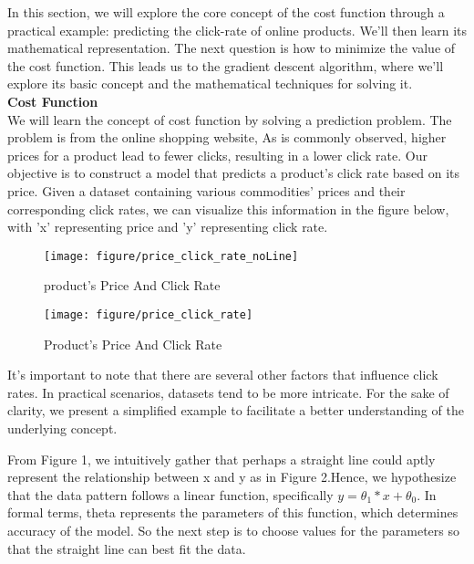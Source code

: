 \documentclass{article}
\begin{document}
    In this section, we will explore the core concept of the cost function through a practical example: predicting the click-rate of online products. We'll then learn its mathematical representation. The next question is how to minimize the value of the cost function. This leads us to the gradient descent algorithm, where we'll explore its basic concept and the mathematical techniques for solving it.\\

    \noindent
    \textbf{Cost Function}\\
    \noindent
     We will learn the concept of cost function by solving a prediction problem. The problem is from the online shopping website, As is commonly observed, higher prices for a product lead to fewer clicks, resulting in a lower click rate. Our objective is to construct a model that predicts a product's click rate based on its price. Given a dataset containing various commodities' prices and their corresponding click rates, we can visualize this information in the figure below, with 'x' representing price and 'y' representing click rate.


     \begin{figure}[htbp]
        \centering
        \texttt{[image: figure/price\_click\_rate\_noLine]}
        \caption{product's Price And Click Rate}
     \end{figure}

     \begin{figure}[htbp]
        \centering
        \texttt{[image: figure/price\_click\_rate]}
        \caption{Product's Price And Click Rate}
     \end{figure}

     It's important to note that there are several other factors that influence click rates. In practical scenarios, datasets tend to be more intricate. For the sake of clarity, we present a simplified example to facilitate a better understanding of the underlying concept.

     From Figure 1,  we intuitively gather that perhaps a straight line could aptly represent the relationship between x and y as in Figure 2.Hence, we hypothesize that the data pattern follows a linear function, specifically $ y = \theta_{1} * x  + \theta_{0}$. In formal terms, theta represents the parameters of this function, which determines accuracy of the model.  So the next step is to choose values for the parameters so that the straight line can best fit the data.
\end{document}

